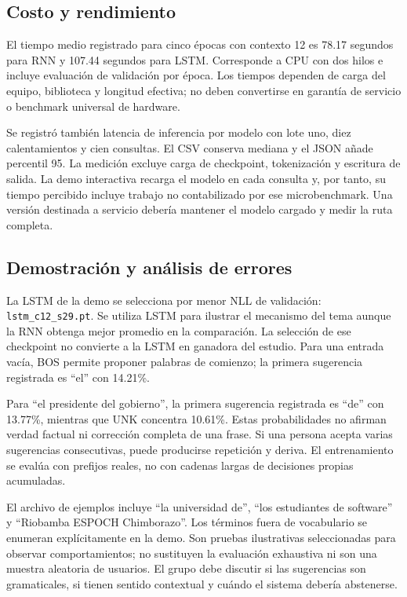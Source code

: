 \subsection{Costo y rendimiento}
El tiempo medio registrado para cinco épocas con contexto 12 es
78.17 segundos para RNN y 107.44 segundos para LSTM. Corresponde
a CPU con dos hilos e incluye evaluación de validación por época.
Los tiempos dependen de carga del equipo, biblioteca y longitud
efectiva; no deben convertirse en garantía de servicio o benchmark
universal de hardware.

Se registró también latencia de inferencia por modelo con lote uno,
diez calentamientos y cien consultas. El CSV conserva mediana y
el JSON añade percentil 95. La medición excluye carga de checkpoint,
tokenización y escritura de salida. La demo interactiva recarga el
modelo en cada consulta y, por tanto, su tiempo percibido incluye
trabajo no contabilizado por ese microbenchmark. Una versión destinada
a servicio debería mantener el modelo cargado y medir la ruta completa.

\subsection{Demostración y análisis de errores}
La LSTM de la demo se selecciona por menor NLL de validación:
\texttt{lstm\_c12\_s29.pt}. Se utiliza LSTM para ilustrar el mecanismo
del tema aunque la RNN obtenga mejor promedio en la comparación.
La selección de ese checkpoint no convierte a la LSTM en ganadora
del estudio. Para una entrada vacía, BOS permite proponer palabras
de comienzo; la primera sugerencia registrada es ``el'' con 14.21\%.

Para ``el presidente del gobierno'', la primera sugerencia registrada
es ``de'' con 13.77\%, mientras que UNK concentra 10.61\%.
Estas probabilidades no afirman verdad factual ni corrección completa
de una frase. Si una persona acepta varias sugerencias consecutivas,
puede producirse repetición y deriva. El entrenamiento se evalúa con
prefijos reales, no con cadenas largas de decisiones propias acumuladas.

El archivo de ejemplos incluye ``la universidad de'', ``los estudiantes
de software'' y ``Riobamba ESPOCH Chimborazo''. Los términos fuera
de vocabulario se enumeran explícitamente en la demo. Son pruebas
ilustrativas seleccionadas para observar comportamientos; no sustituyen
la evaluación exhaustiva ni son una muestra aleatoria de usuarios.
El grupo debe discutir si las sugerencias son gramaticales, si tienen
sentido contextual y cuándo el sistema debería abstenerse.


